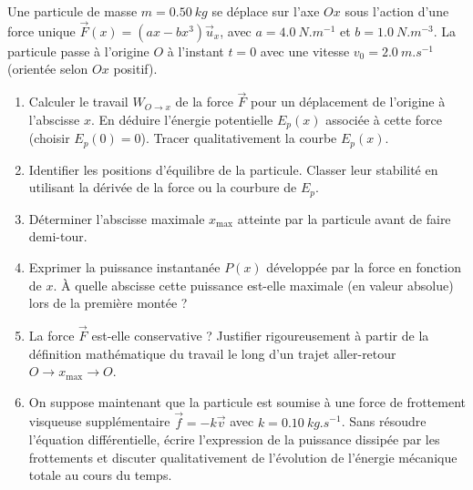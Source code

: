 \documentclass[11pt]{article}
\begin{document}
\begin{exercice}
Une particule de masse $m = \SI{0,50}{kg}$ se déplace sur l'axe $Ox$ sous l'action d'une force unique $\vec{F}(x) = \left( a x - b x^3 \right) \vec{u}_x$, avec $a = \SI{4,0}{N.m^{-1}}$ et $b = \SI{1,0}{N.m^{-3}}$. La particule passe à l'origine $O$ à l'instant $t=0$ avec une vitesse $v_0 = \SI{2,0}{m.s^{-1}}$ (orientée selon $Ox$ positif).
\begin{enumerate}
    \item Calculer le travail $W_{O \to x}$ de la force $\vec{F}$ pour un déplacement de l'origine à l'abscisse $x$. En déduire l'énergie potentielle $E_p(x)$ associée à cette force (choisir $E_p(0)=0$). Tracer qualitativement la courbe $E_p(x)$.
    \item Identifier les positions d'équilibre de la particule. Classer leur stabilité en utilisant la dérivée de la force ou la courbure de $E_p$.
    \item Déterminer l'abscisse maximale $x_{\text{max}}$ atteinte par la particule avant de faire demi-tour.
    \item Exprimer la puissance instantanée $P(x)$ développée par la force en fonction de $x$. À quelle abscisse cette puissance est-elle maximale (en valeur absolue) lors de la première montée ?
    \item La force $\vec{F}$ est-elle conservative ? Justifier rigoureusement à partir de la définition mathématique du travail le long d'un trajet aller-retour $O \to x_{\text{max}} \to O$.
    \item On suppose maintenant que la particule est soumise à une force de frottement visqueuse supplémentaire $\vec{f} = -k \vec{v}$ avec $k = \SI{0,10}{kg.s^{-1}}$. Sans résoudre l'équation différentielle, écrire l'expression de la puissance dissipée par les frottements et discuter qualitativement de l'évolution de l'énergie mécanique totale au cours du temps.
\end{enumerate}
\end{exercice}
\end{document}
